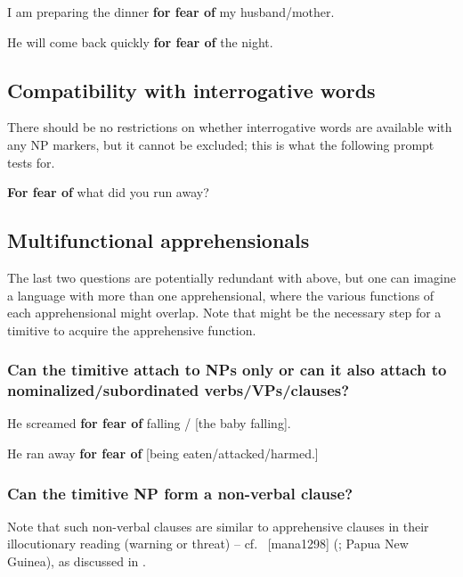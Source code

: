 \documentclass[output=paper,colorlinks,citecolor=brown]{langscibook}
\begin{document}
\ea \label{p71} I am preparing the dinner \textbf{for fear of} my husband/mother.
\z

\ea \label{p72} He will come back quickly \textbf{for fear of} the night.
\z

\subsection{Compatibility with interrogative words}
\label{subsec:timinterrogative}

There should be no restrictions on whether interrogative words are available with any NP markers, but it cannot be excluded; this is what the following prompt tests for.

\ea \label{p73} \textbf{For fear of} what did you run away?
\z


\subsection{Multifunctional apprehensionals}
\label{subsec:timmulti}

The last two questions are potentially redundant with  above, but one can imagine a language with more than one apprehensional, where the various functions of each apprehensional might overlap. Note that  might be the necessary step for a timitive to acquire the apprehensive function.

\subsubsection{Can the timitive attach to NPs only or can it also attach to nominalized/subordinated verbs/VPs/clauses?}
\label{3.6.1}

\ea \label{p74} He screamed \textbf{for fear of} falling \textnormal{/} [the baby falling].
\z

\ea \label{p75} He ran away \textbf{for fear of} [being eaten\textnormal{/}attacked\textnormal{/}harmed.]
\z

\subsubsection{Can the timitive NP form a non-verbal clause?} \label{3.6.2}

Note that such non-verbal clauses are similar to apprehensive clauses in their illocutionary reading (warning or threat) – cf.\  [mana1298] (; Papua New Guinea), as discussed in \citet[153--154]{aikhenvald2008manambu}.
\end{document}

